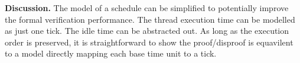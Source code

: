 {\bf Discussion.}
The model of a schedule can be simplified to potentially improve the formal verification performance. The thread execution time can be modelled as just one tick. The idle time can be abstracted out. As long as the execution order is preserved, it is straightforward to show the proof/disproof is equavilent to a model directly mapping each base time unit to a tick.